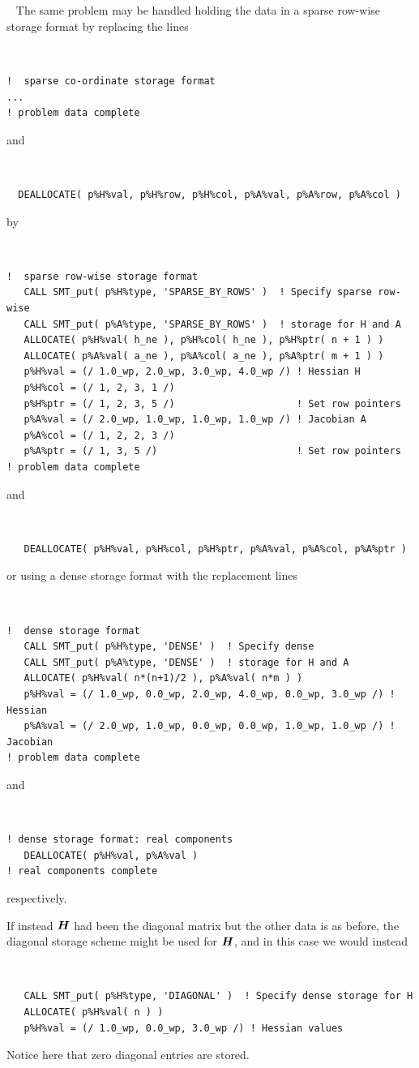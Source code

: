 \documentclass{galahad}
\begin{document}
{\tt \small
\VerbatimInput{\packageexample}
}
\noindent
\noindent
The same problem may be handled holding the data in
a sparse row-wise storage format by replacing the lines
{\tt \small
\begin{verbatim}
!  sparse co-ordinate storage format
...
! problem data complete
\end{verbatim}
}
\noindent
and
{\tt \small
\begin{verbatim}
  DEALLOCATE( p%H%val, p%H%row, p%H%col, p%A%val, p%A%row, p%A%col )
\end{verbatim}
}
\noindent
by
{\tt \small
\begin{verbatim}
!  sparse row-wise storage format
   CALL SMT_put( p%H%type, 'SPARSE_BY_ROWS' )  ! Specify sparse row-wise
   CALL SMT_put( p%A%type, 'SPARSE_BY_ROWS' )  ! storage for H and A
   ALLOCATE( p%H%val( h_ne ), p%H%col( h_ne ), p%H%ptr( n + 1 ) )
   ALLOCATE( p%A%val( a_ne ), p%A%col( a_ne ), p%A%ptr( m + 1 ) )
   p%H%val = (/ 1.0_wp, 2.0_wp, 3.0_wp, 4.0_wp /) ! Hessian H
   p%H%col = (/ 1, 2, 3, 1 /)
   p%H%ptr = (/ 1, 2, 3, 5 /)                     ! Set row pointers
   p%A%val = (/ 2.0_wp, 1.0_wp, 1.0_wp, 1.0_wp /) ! Jacobian A
   p%A%col = (/ 1, 2, 2, 3 /)
   p%A%ptr = (/ 1, 3, 5 /)                        ! Set row pointers
! problem data complete
\end{verbatim}
}
\noindent
and
{\tt \small
\begin{verbatim}
   DEALLOCATE( p%H%val, p%H%col, p%H%ptr, p%A%val, p%A%col, p%A%ptr )
\end{verbatim}
}
\noindent
or using a dense storage format with the replacement lines
{\tt \small
\begin{verbatim}
!  dense storage format
   CALL SMT_put( p%H%type, 'DENSE' )  ! Specify dense
   CALL SMT_put( p%A%type, 'DENSE' )  ! storage for H and A
   ALLOCATE( p%H%val( n*(n+1)/2 ), p%A%val( n*m ) )
   p%H%val = (/ 1.0_wp, 0.0_wp, 2.0_wp, 4.0_wp, 0.0_wp, 3.0_wp /) ! Hessian
   p%A%val = (/ 2.0_wp, 1.0_wp, 0.0_wp, 0.0_wp, 1.0_wp, 1.0_wp /) ! Jacobian
! problem data complete
\end{verbatim}
}
\noindent
and
{\tt \small
\begin{verbatim}
! dense storage format: real components
   DEALLOCATE( p%H%val, p%A%val )
! real components complete
\end{verbatim}
}
\noindent
respectively.

If instead ${\bm{H}}$ had been the diagonal matrix
but the other data is as before, the diagonal storage scheme
might be used for ${\bm{H}}$, and in this case we would instead
{\tt \small
\begin{verbatim}
   CALL SMT_put( p%H%type, 'DIAGONAL' )  ! Specify dense storage for H
   ALLOCATE( p%H%val( n ) )
   p%H%val = (/ 1.0_wp, 0.0_wp, 3.0_wp /) ! Hessian values
\end{verbatim}
}
\noindent
Notice here that zero diagonal entries are stored.
\end{document}
